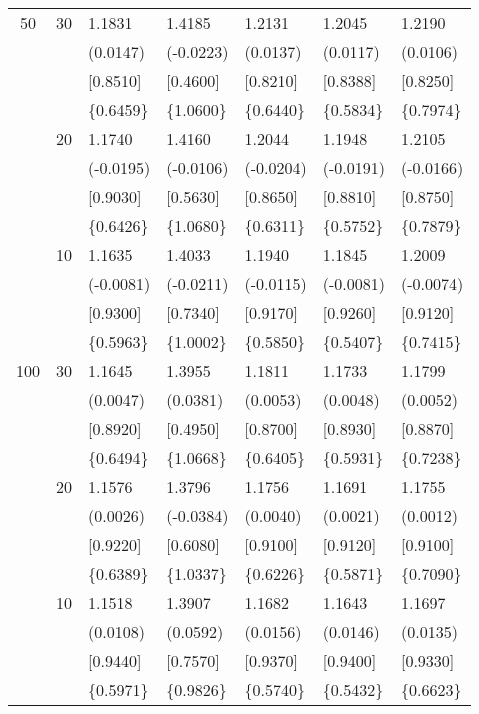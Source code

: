 \begin{table}[H]
{\begin{tabular}{c c | C{2.48cm} | C{2.48cm} | C{2.48cm} | C{2.48cm} | C{2.48cm} }
			\cmidrule(lr){1-7}
			50&30&1.1831&1.4185&1.2131&1.2045&1.2190\\
			&&(0.0147)&(-0.0223)&(0.0137)&(0.0117)&(0.0106)\\
			&&[0.8510]&[0.4600]&[0.8210]&[0.8388]&[0.8250]\\
			&&\{0.6459\}&\{1.0600\}&\{0.6440\}&\{0.5834\}&\{0.7974\}\\
			&20&1.1740&1.4160&1.2044&1.1948&1.2105\\
			&&(-0.0195)&(-0.0106)&(-0.0204)&(-0.0191)&(-0.0166)\\
			&&[0.9030]&[0.5630]&[0.8650]&[0.8810]&[0.8750]\\
			&&\{0.6426\}&\{1.0680\}&\{0.6311\}&\{0.5752\}&\{0.7879\}\\
			&10&1.1635&1.4033&1.1940&1.1845&1.2009\\
			&&(-0.0081)&(-0.0211)&(-0.0115)&(-0.0081)&(-0.0074)\\
			&&[0.9300]&[0.7340]&[0.9170]&[0.9260]&[0.9120]\\
			&&\{0.5963\}&\{1.0002\}&\{0.5850\}&\{0.5407\}&\{0.7415\}\\
			\cmidrule(lr){1-7}
			100&30&1.1645&1.3955&1.1811&1.1733&1.1799\\
			&&(0.0047)&(0.0381)&(0.0053)&(0.0048)&(0.0052)\\
			&&[0.8920]&[0.4950]&[0.8700]&[0.8930]&[0.8870]\\
			&&\{0.6494\}&\{1.0668\}&\{0.6405\}&\{0.5931\}&\{0.7238\}\\
			&20&1.1576&1.3796&1.1756&1.1691&1.1755\\
			&&(0.0026)&(-0.0384)&(0.0040)&(0.0021)&(0.0012)\\
			&&[0.9220]&[0.6080]&[0.9100]&[0.9120]&[0.9100]\\
			&&\{0.6389\}&\{1.0337\}&\{0.6226\}&\{0.5871\}&\{0.7090\}\\
			&10&1.1518&1.3907&1.1682&1.1643&1.1697\\
			&&(0.0108)&(0.0592)&(0.0156)&(0.0146)&(0.0135)\\
			&&[0.9440]&[0.7570]&[0.9370]&[0.9400]&[0.9330]\\
			&&\{0.5971\}&\{0.9826\}&\{0.5740\}&\{0.5432\}&\{0.6623\}\\
			\bottomrule[1.5pt]
	\end{tabular}}
	\label{table:table S.1}
\end{table}

